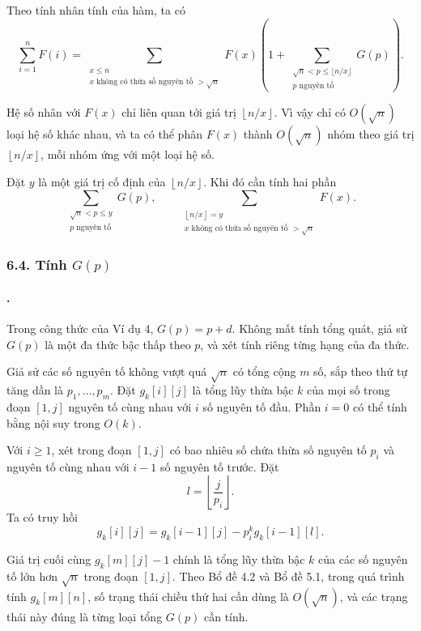 \documentclass[11pt]{article}
\begin{document}
Theo tính nhân tính của hàm, ta có
\[
  \sum_{i=1}^{n}F(i)
  =
  \sum_{\substack{x\le n\\x\text{ không có thừa số nguyên tố }>\sqrt n}}
  F(x)
  \left(
    1+\sum_{\substack{\sqrt n<p\le \lfloor n/x\rfloor\\p\text{ nguyên tố}}}
    G(p)
  \right).
\]

Hệ số nhân với \(F(x)\) chỉ liên quan tới giá trị
\(\left\lfloor n/x\right\rfloor\). Vì vậy chỉ có \(O(\sqrt n)\) loại hệ số
khác nhau, và ta có thể phân \(F(x)\) thành \(O(\sqrt n)\) nhóm theo giá trị
\(\left\lfloor n/x\right\rfloor\), mỗi nhóm ứng với một loại hệ số.

Đặt \(y\) là một giá trị cố định của \(\left\lfloor n/x\right\rfloor\). Khi đó
cần tính hai phần
\[
  \sum_{\substack{\sqrt n<p\le y\\p\text{ nguyên tố}}}G(p),
  \qquad
  \sum_{\substack{\left\lfloor n/x\right\rfloor=y\\
  x\text{ không có thừa số nguyên tố }>\sqrt n}}F(x).
\]

\subsubsection*{6.4. Tính \(G(p)\)}

\paragraph{.}
Trong công thức của Ví dụ 4, \(G(p)=p+d\). Không mất tính tổng quát, giả sử
\(G(p)\) là một đa thức bậc thấp theo \(p\), và xét tính riêng từng hạng của
đa thức.

Giả sử các số nguyên tố không vượt quá \(\sqrt n\) có tổng cộng \(m\) số, sắp
theo thứ tự tăng dần là \(p_1,\ldots,p_m\). Đặt \(g_k[i][j]\) là tổng lũy thừa
bậc \(k\) của mọi số trong đoạn \([1,j]\) nguyên tố cùng nhau với \(i\) số
nguyên tố đầu. Phần \(i=0\) có thể tính bằng nội suy trong \(O(k)\).

Với \(i\ge1\), xét trong đoạn \([1,j]\) có bao nhiêu số chứa thừa số nguyên tố
\(p_i\) và nguyên tố cùng nhau với \(i-1\) số nguyên tố trước. Đặt
\[
  l=\left\lfloor\frac{j}{p_i}\right\rfloor.
\]
Ta có truy hồi
\[
  g_k[i][j]=g_k[i-1][j]-p_i^k g_k[i-1][l].
\]

Giá trị cuối cùng \(g_k[m][j]-1\) chính là tổng lũy thừa bậc \(k\) của các số
nguyên tố lớn hơn \(\sqrt n\) trong đoạn \([1,j]\). Theo Bổ đề 4.2 và Bổ đề
5.1, trong quá trình tính \(g_k[m][n]\), số trạng thái chiều thứ hai cần dùng
là \(O(\sqrt n)\), và các trạng thái này đúng là từng loại tổng \(G(p)\) cần
tính.
\end{document}
